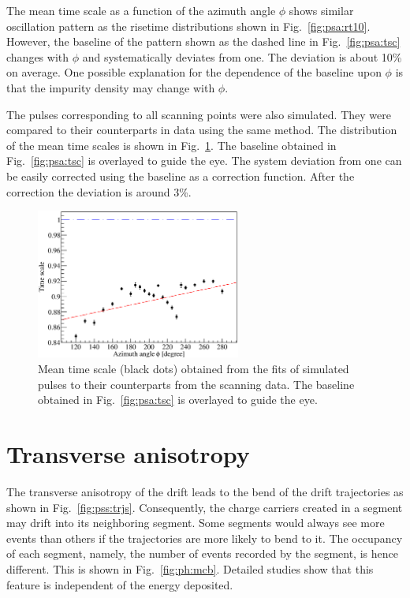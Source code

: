 The mean time scale as a function of the azimuth angle $\phi$ shows similar oscillation pattern as the risetime distributions shown in Fig.~\ref{fig:psa:rt10}. However, the baseline of the pattern shown as the dashed line in Fig.~\ref{fig:psa:tsc} changes with $\phi$ and systematically deviates from one. The deviation is about 10\% on average. One possible explanation for the dependence of the baseline upon $\phi$ is that the impurity density may change with $\phi$.

The pulses corresponding to all scanning points were also simulated. They were compared to their counterparts in data using the same method. The distribution of the mean time scales is shown in Fig.~\ref{fig:psa:tsl}. The baseline obtained in Fig.~\ref{fig:psa:tsc} is overlayed to guide the eye. The system deviation from one can be easily corrected using the baseline as a correction function. After the correction the deviation is around 3\%.

\begin{figure}[htbp]
\centering
\includegraphics[width=0.6\textwidth]{tsline}
\caption{Mean time scale (black dots) obtained from the fits of simulated pulses to their counterparts from the scanning data. The baseline obtained in Fig.~\ref{fig:psa:tsc} is overlayed to guide the eye.}
\label{fig:psa:tsl}
\end{figure}


\section{Transverse anisotropy}
\label{sec:psa:tra}
The transverse anisotropy of the drift leads to the bend of the drift trajectories as shown in Fig.~\ref{fig:pss:trjs}. Consequently, the charge carriers created in a segment may drift into its neighboring segment. Some segments would always see more events than others if the trajectories are more likely to bend to it. The occupancy of each segment, namely, the number of events recorded by the segment, is hence different. This is shown in Fig.~\ref{fig:ph:mcb}. Detailed studies show that this feature is independent of the energy deposited.

